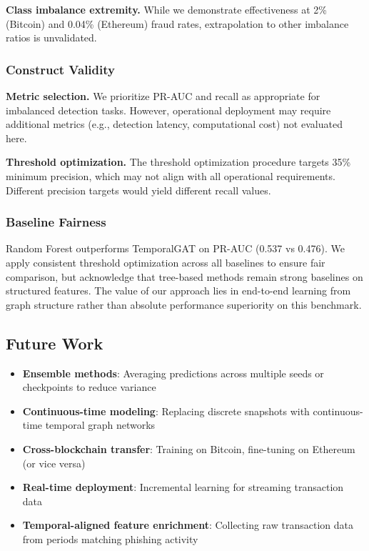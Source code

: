 \documentclass[12pt,a4paper]{article}
\begin{document}
\textbf{Class imbalance extremity.} While we demonstrate effectiveness at 2\% (Bitcoin) and 0.04\% (Ethereum) fraud rates, extrapolation to other imbalance ratios is unvalidated.

\subsubsection{Construct Validity}
\textbf{Metric selection.} We prioritize PR-AUC and recall as appropriate for imbalanced detection tasks. However, operational deployment may require additional metrics (e.g., detection latency, computational cost) not evaluated here.

\textbf{Threshold optimization.} The threshold optimization procedure targets 35\% minimum precision, which may not align with all operational requirements. Different precision targets would yield different recall values.

\subsubsection{Baseline Fairness}
Random Forest outperforms TemporalGAT on PR-AUC (0.537 vs 0.476). We apply consistent threshold optimization across all baselines to ensure fair comparison, but acknowledge that tree-based methods remain strong baselines on structured features. The value of our approach lies in end-to-end learning from graph structure rather than absolute performance superiority on this benchmark.

\subsection{Future Work}
\begin{itemize}
    \item \textbf{Ensemble methods}: Averaging predictions across multiple seeds or checkpoints to reduce variance
    \item \textbf{Continuous-time modeling}: Replacing discrete snapshots with continuous-time temporal graph networks
    \item \textbf{Cross-blockchain transfer}: Training on Bitcoin, fine-tuning on Ethereum (or vice versa)
    \item \textbf{Real-time deployment}: Incremental learning for streaming transaction data
    \item \textbf{Temporal-aligned feature enrichment}: Collecting raw transaction data from periods matching phishing activity
\end{itemize}
\end{document}
